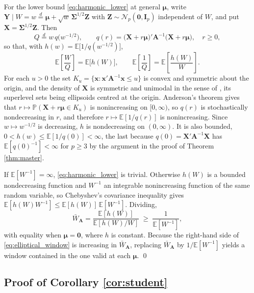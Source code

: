 \documentclass[a4paper,fleqn]{cas-sc}
\theoremstyle{plain}
\theoremstyle{definition}
\theoremstyle{remark}
\newenvironment{revblock}{}{}
\newcommand{\E}{\mathbb{E}}
\begin{document}
\begin{appendices}
For the lower bound \eqref{eq:harmonic_lower} at general $\bm\mu$, write $\bm Y\mid W=w\stackrel{d}{=}\bm\mu+\sqrt w\,\bm\Sigma^{1/2}\bm Z$ with $\bm Z\sim\mathcal N_p(\bm 0,\bm I_p)$ independent of $W$, and put $\bm X=\bm\Sigma^{1/2}\bm Z$. Then
\begin{equation}
Q\stackrel{d}{=}w\,q\bigl(w^{-1/2}\bigr),
\qquad
q(r)=\bigl(\bm X+r\bm\mu\bigr)'\bm A^{-1}\bigl(\bm X+r\bm\mu\bigr),
\quad r\ge0,
\end{equation}
so that, with $h(w)=\E\bigl[1/q(w^{-1/2})\bigr]$,
\begin{equation}
\E\left[\frac{W}{Q}\right]=\E\bigl[h(W)\bigr],
\qquad
\E\left[\frac{1}{Q}\right]=\E\left[\frac{h(W)}{W}\right].
\end{equation}
For each $u>0$ the set $K_u=\{\bm x:\bm x'\bm A^{-1}\bm x\le u\}$ is convex and symmetric about the origin, and the density of $\bm X$ is symmetric and unimodal in the sense of \citet{anderson1955}, its superlevel sets being ellipsoids centred at the origin. Anderson's theorem gives that $r\mapsto\mathbb P(\bm X+r\bm\mu\in K_u)$ is nonincreasing on $[0,\infty)$, so $q(r)$ is stochastically nondecreasing in $r$, and therefore $r\mapsto\E[1/q(r)]$ is nonincreasing. Since $w\mapsto w^{-1/2}$ is decreasing, $h$ is nondecreasing on $(0,\infty)$. It is also bounded, $0<h(w)\le\E[1/q(0)]<\infty$, the last because $q(0)=\bm X'\bm A^{-1}\bm X$ has $\E[q(0)^{-1}]<\infty$ for $p\ge3$ by the argument in the proof of Theorem \ref{thm:master}.

If $\E[W^{-1}]=\infty$, \eqref{eq:harmonic_lower} is trivial. Otherwise $h(W)$ is a bounded nondecreasing function and $W^{-1}$ an integrable nonincreasing function of the same random variable, so Chebyshev's covariance inequality gives $\E[h(W)W^{-1}]\le\E[h(W)]\,\E[W^{-1}]$. Dividing,
\begin{equation}
\bar W_{\bm A}=\frac{\E[h(W)]}{\E[h(W)/W]}\;\ge\;\frac{1}{\E[W^{-1}]} ,
\end{equation}
with equality when $\bm\mu=\bm 0$, where $h$ is constant. Because the right-hand side of \eqref{eq:elliptical_window} is increasing in $\bar W_{\bm A}$, replacing $\bar W_{\bm A}$ by $1/\E[W^{-1}]$ yields a window contained in the one valid at each $\bm\mu$.
\qed

\subsection*{Proof of Corollary \ref{cor:student}}


\end{appendices}
\end{document}
